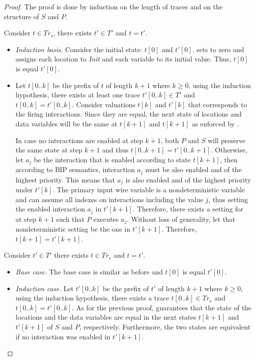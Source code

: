 \begin{proof}
%
The proof is done by induction on the length of traces and on the structure of $S$ and $P$.

Consider $t \in Tr_s$, there exists $t' \in T'$ and $t = t'$. 
\begin{itemize}
\item
\textit{Induction basis.}
Consider the initial state: $t[0]$ and $t'[0]$.  sets  to zero and assigns each location to \textit{Init} and each variable to its initial value. Thus, $t[0]$ is equal $t'[0]$. 
\item
Let $t[0..k]$ be the prefix of $t$ of length $k+1$ where $k\ge 0$, using the induction hypothesis, there exists at least one trace 
  $t'[0..k] \in T'$ and $t[0..k]=t'[0..k]$. 
  Consider valuations $t[k]$ and $t'[k]$ that corresponds to the firing interactions.
  Since they are equal, the next state of locations
  and data variables will be the same at $t[k+1]$ and $t[k+1]$ as enforced by . 

  In case no interactions are enabled at step $k+1$, both $P$ and $S$ will preserve the same state at step $k+1$ and thus $t[0..k+1] =t'[0..k+1]$. 
  Otherwise, let $a_j$ be the interaction that is enabled according to state $t[k+1]$, 
  then according to BIP semantics, interaction $a_j$ must be also enabled and of the highest priority. 
  This means that $a_j$ is also enabled and of the highest priority under $t'[k]$. 
  The primary input  wire variable is a nondeterministic variable and can assume all indexes on interactions including the value 
  $j$, thus setting the enabled interaction $a_j$ in $t'[k+1]$. 
  Therefore, there exists a setting for  at step $k+1$ such that $P$ executes $a_j$. 
  Without loss of generality, let that nondeterministic setting be the one in $t'[k+1]$. 
  Therefore, $t[k+1] = t'[k+1]$. 
\end{itemize}
%
Consider $t' \in T'$ there exists $t \in Tr_s$ and $t = t'$.
%
\begin{itemize}
\item
\textit{Base case.}
The base case is similar as before and $t[0]$ is equal $t'[0]$.
\item
\textit{Induction case.}
Let $t'[0..k]$ be the prefix of $t'$ of length $k+1$ where $k\ge 0$, using the induction hypothesis, there exists a trace 
  $t[0..k] \in Tr_s$ and $t[0..k]=t'[0..k]$. 
  As for the previous proof,  guarantees that the state of the locations and the data variables are equal in the next states $t[k+1]$ and $t'[k+1]$ of $S$ and $P$, respectively. Furthermore, the two states are equivalent if no interaction was enabled in $t'[k+1]$. 


\end{itemize}
\end{proof}
